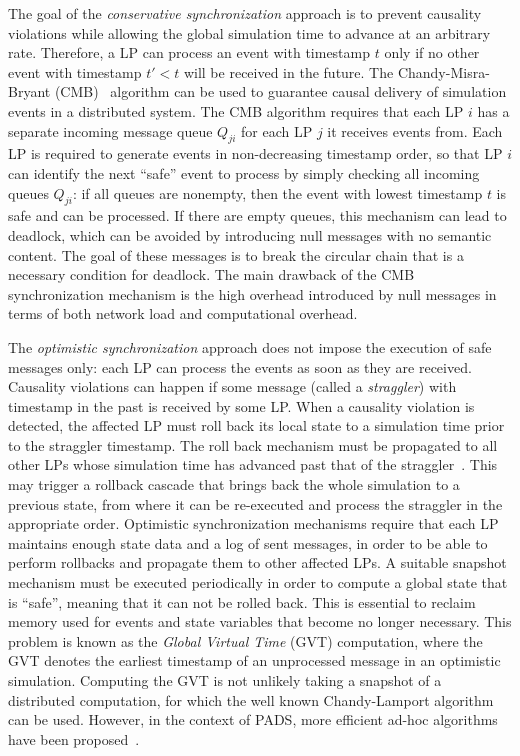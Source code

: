 \documentclass[1p]{elsarticle}
\begin{document}
The goal of the \emph{conservative synchronization} approach is to
prevent causality violations while allowing the global simulation time
to advance at an arbitrary rate. Therefore, a LP can process an event
with timestamp $t$ only if no other event with timestamp $t' < t$ will
be received in the future. The Chandy-Misra-Bryant
(CMB)~\cite{misra86} algorithm can be used to guarantee causal
delivery of simulation events in a distributed system. The CMB
algorithm requires that each LP $i$ has a separate incoming message
queue $Q_{ji}$ for each LP $j$ it receives events from. Each LP is
required to generate events in non-decreasing timestamp order, so that
LP $i$ can identify the next ``safe'' event to process by simply
checking all incoming queues $Q_{ji}$: if all queues are nonempty,
then the event with lowest timestamp $t$ is safe and can be processed.
If there are empty queues, this mechanism can lead to deadlock, which
can be avoided by introducing null messages with no semantic
content. The goal of these messages is to break the circular chain
that is a necessary condition for deadlock. The main drawback of the
CMB synchronization mechanism is the high overhead introduced by null
messages in terms of both network load and computational overhead.

The \emph{optimistic synchronization} approach does not impose the
execution of safe messages only: each LP can process the events as
soon as they are received. Causality violations can happen if some
message (called a \emph{straggler}) with timestamp in the past is
received by some LP. When a causality violation is detected, the
affected LP must roll back its local state to a simulation time prior
to the straggler timestamp. The roll back mechanism must be propagated
to all other LPs whose simulation time has advanced past that of the
straggler~\cite{timewarp,quaglia2003}. This may trigger a rollback
cascade that brings back the whole simulation to a previous state,
from where it can be re-executed and process the straggler in the
appropriate order.
Optimistic synchronization mechanisms require that each LP maintains
enough state data and a log of sent messages, in order to be able to
perform rollbacks and propagate them to other affected LPs. A suitable
snapshot mechanism must be executed periodically in order to compute a
global state that is ``safe'', meaning that it can not be rolled back.
This is essential to reclaim memory used for events and state
variables that become no longer necessary. This problem is known as
the \emph{Global Virtual Time} (GVT) computation, where the GVT
denotes the earliest timestamp of an unprocessed message in an
optimistic simulation. Computing the GVT is not unlikely taking a
snapshot of a distributed computation, for which the well known
Chandy-Lamport algorithm~\cite{ChandyL85} can be used. However, in the
context of PADS, more efficient ad-hoc algorithms have been
proposed~\cite{gvt95}.
\end{document}
